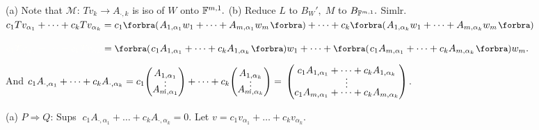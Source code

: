 \par\quad
(a) Note that $\mathcal{M}\!:\,Tv_k\rightarrow A_{\cdot,k}$ is iso of $W$ onto ${\mathbb{F}}^{m,1}.$ \quad (b) Reduce $L$ to $B_W',\;M$ to $B_{{\mathbb{F}}^{m,1}}.$ Simlr.\PfEnd\vspace{4pt}\quad
\Or\;$c_1Tv_{\alpha_1}+\dots+c_kTv_{\alpha_k}=c_1\BigPar{A_{1,{\alpha_1}}w_1+\dots+A_{m,{\alpha_1}}w_m}+\dots+c_k\BigPar{A_{1,{\alpha_k}}w_1+\dots+A_{m,{\alpha_k}}w_m}$\par\vspace{2pt}\quad
\Blind{\Or\;}$\Blind{c_1Tv_{\alpha_1}+\dots+c_kTv_{\alpha_k}}=\BigPar{c_1A_{1,{\alpha_1}}+\dots+c_kA_{1,{\alpha_k}}}w_1+\dots+\BigPar{c_1A_{m,{\alpha_1}}+\dots+c_kA_{m,{\alpha_k}}}w_m.$\par\vspace{4pt}\quad
\Blind{\Or\;}And \;$c_1A_{\cdot,{\alpha_1}}+\dots+c_kA_{\cdot,{\alpha_k}}=c_1{\normalsize\begin{pmatrix}A_{1,{\alpha_1}}\\[-4pt]\vdots\\[-10pt]A_{m,{\alpha_1}}\end{pmatrix}}+\dots+c_k{\normalsize\begin{pmatrix}A_{1,{\alpha_k}}\\[-4pt]\vdots\\[-10pt]A_{m,{\alpha_k}}\end{pmatrix}}{}={}\normalsize\begin{pmatrix}c_1 A_{1,{\alpha_1}}+\dots+c_kA_{1,{\alpha_k}}\\[-4pt]\vdots\\[-4pt]c_1A_{m,{\alpha_1}}+\dots+c_kA_{m,{\alpha_k}}\end{pmatrix}$.\par\vspace{6pt}\quad
(a) $P\Rightarrow Q:$\,\;Sups $\;c_1A_{\cdot,{\alpha_1}}+\dots+c_kA_{\cdot,{\alpha_k}}=0.$ \;Let $v=c_1v_{\alpha_1}+\dots+c_kv_{\alpha_k}.$\par\quad\Ha
